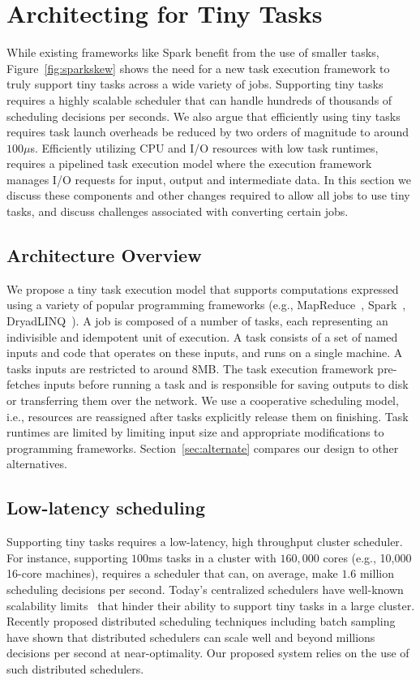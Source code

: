 \section{Architecting for Tiny Tasks}
\label{sec:architecture}
While existing frameworks like Spark benefit from the use of smaller tasks, Figure~\ref{fig:sparkskew}
shows the need for a new task execution framework to truly support tiny tasks across a wide
variety of jobs.
Supporting tiny tasks requires a highly scalable scheduler that can handle hundreds 
of thousands of scheduling decisions per seconds. We also argue that efficiently using
tiny tasks requires task launch overheads be reduced by two orders of magnitude to around $100\mu$s.
Efficiently utilizing CPU and I/O resources with low task runtimes, requires
a pipelined task execution model where the execution framework manages I/O
requests for input, output and intermediate data. In this section
we discuss these components and other changes required to allow all jobs to use
tiny tasks, and discuss challenges associated with converting certain jobs.

\subsection{Architecture Overview}
We propose a tiny task execution model that supports computations expressed using 
a variety of popular programming frameworks (e.g., MapReduce~\cite{dean2008mapreduce},
Spark~\cite{zaharia2010spark}, DryadLINQ~\cite{yu2008dryadlinq}). 
A job is composed of a number of tasks, each representing an indivisible
and idempotent unit of execution. A task consists of a set of named inputs
and code that operates on these inputs, and runs on a single machine.
A tasks inputs are restricted to around 8MB. The task execution framework
pre-fetches inputs before running a task and is responsible for saving
outputs to disk or transferring them over the network.  We use a cooperative 
scheduling model, i.e., resources are reassigned after tasks explicitly release 
them on finishing. Task runtimes are limited by limiting input size and
appropriate modifications to programming frameworks. Section~\ref{sec:alternate} 
compares our design to other alternatives.

\subsection{Low-latency scheduling}
Supporting tiny tasks requires a low-latency, high throughput cluster scheduler.
For instance, supporting $100$ms tasks in a cluster with $160,000$ cores
(e.g., 10,000 16-core machines),
requires a scheduler that can, on average, make $1.6$ million scheduling
decisions per second.
Today's centralized schedulers have well-known scalability
limits~\cite{wilkesberkeley} that
hinder their ability to support tiny tasks in a large cluster.
Recently proposed distributed scheduling techniques including batch
sampling~\cite{ousterhoutbatch} have shown that distributed schedulers
can scale well and beyond millions decisions per second at near-optimality.
Our proposed system relies on the use of such distributed schedulers.

